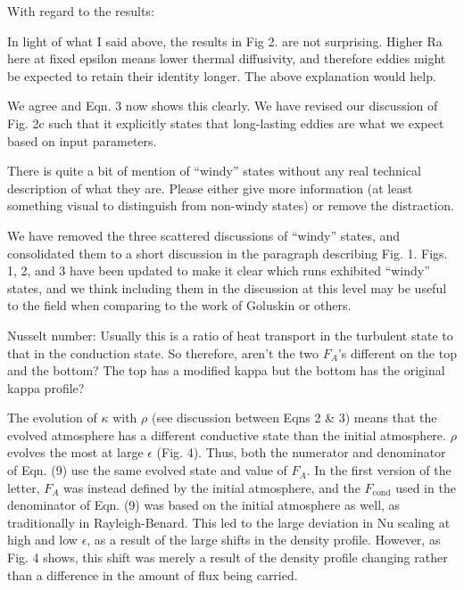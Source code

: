 \documentclass[aps, 11pt, singlecolumn]{revtex4-1} %
\begin{document}
\begin{singlespace}
\begin{myquotation}
With regard to the results:

In light of what I said above, the results in Fig 2. are not
surprising. Higher Ra here at fixed epsilon means lower thermal
diffusivity, and therefore eddies might be expected to retain their
identity longer. The above explanation would help.
\end{myquotation}
We agree and Eqn. 3 now shows this clearly.
We have revised our discussion of Fig. 2c such that it 
explicitly states that long-lasting eddies are what we expect based on 
input parameters.

\begin{myquotation}
There is quite a bit of mention of “windy” states without any real
technical description of what they are. Please either give more
information (at least something visual to distinguish from non-windy
states) or remove the distraction.
\end{myquotation}
We have removed the three scattered discussions of ``windy'' states,
and consolidated them to a short discussion in the paragraph describing
Fig. 1.  Figs. 1, 2, and 3 have been updated to make it clear which
runs exhibited ``windy'' states, and we think including them in the
discussion at this level may be useful to the field when comparing to
the work of Goluskin or others.

\begin{myquotation}
Nusselt number: Usually this is a ratio of heat transport in the
turbulent state to that in the conduction state. So therefore, aren’t
the two $F_A$’s different on the top and the bottom? The top has a
modified kappa but the bottom has the original kappa profile?
\end{myquotation}
The evolution of $\kappa$ with $\rho$ (see discussion between
Eqns 2 \& 3) means that the evolved atmosphere has a different
conductive state than the initial atmosphere.  $\rho$ evolves
the most at large $\epsilon$ (Fig. 4).
Thus, both the numerator and denominator of Eqn. (9) 
use the same evolved state and
value of $F_A$.  In the first version of the letter, 
$F_A$ was instead defined by the initial atmosphere, and
the $F_{\text{cond}}$ used in the denominator of Eqn. (9) was
based on the initial atmosphere as well, as traditionally
in Rayleigh-Benard.  This led to the
large deviation in Nu scaling at high and low $\epsilon$,
as a result of the large shifts in the density profile.
However, as Fig. 4 shows, this shift was merely a result of the
density profile changing rather than a difference in the
amount of flux being carried.


\end{singlespace}
\end{document}
